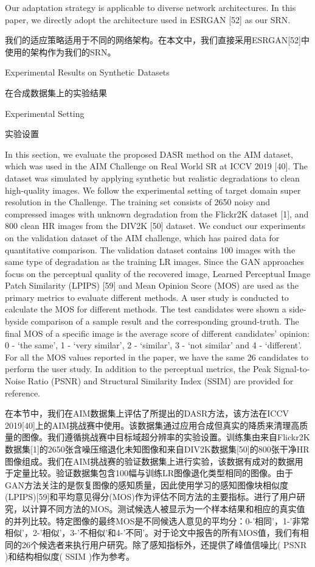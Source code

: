 Our adaptation strategy is applicable to diverse network architectures. In this paper, we directly adopt the architecture used in ESRGAN [52] as our SRN.

我们的适应策略适用于不同的网络架构。在本文中，我们直接采用ESRGAN[52]中使用的架构作为我们的SRN。

Experimental Results on Synthetic Datasets

在合成数据集上的实验结果

Experimental Setting

实验设置

In this section, we evaluate the proposed DASR method on the AIM dataset, which was used in the AIM Challenge on Real World SR at ICCV 2019 [40]. The dataset was simulated by applying synthetic but realistic degradations to clean high-quality images. We follow the experimental setting of target domain super resolution in the Challenge. The training set consists of 2650 noisy and compressed images with unknown degradation from the Flickr2K dataset [1], and 800 clean HR images from the DIV2K [50] dataset. We conduct our experiments on the validation dataset of the AIM challenge, which has paired data for quantitative comparison. The validation dataset contains 100 images with the same type of degradation as the training LR images. Since the GAN approaches focus on the perceptual quality of the recovered image, Learned Perceptual Image Patch Similarity (LPIPS) [59] and Mean Opinion Score (MOS) are used as the primary metrics to evaluate different methods. A user study is conducted to calculate the MOS for different methods. The test candidates were shown a side-byside comparison of a sample result and the corresponding ground-truth. The final MOS of a specific image is the average score of different candidates’ opinion: 0 - ‘the same’, 1 - ‘very similar’, 2 - ‘similar’, 3 - ‘not similar’ and 4 - ‘different’. For all the MOS values reported in the paper, we have the same 26 candidates to perform the user study. In addition to the perceptual metrics, the Peak Signal-to-Noise Ratio (PSNR) and Structural Similarity Index (SSIM) are provided for reference.

在本节中，我们在AIM数据集上评估了所提出的DASR方法，该方法在ICCV 2019[40]上的AIM挑战赛中使用。该数据集通过应用合成但真实的降质来清理高质量的图像。我们遵循挑战赛中目标域超分辨率的实验设置。训练集由来自Flickr2K数据集[1]的2650张含噪压缩退化未知图像和来自DIV2K数据集[50]的800张干净HR图像组成。我们在AIM挑战赛的验证数据集上进行实验，该数据有成对的数据用于定量比较。验证数据集包含100幅与训练LR图像退化类型相同的图像。由于GAN方法关注的是恢复图像的感知质量，因此使用学习的感知图像块相似度(LPIPS)[59]和平均意见得分(MOS)作为评估不同方法的主要指标。进行了用户研究，以计算不同方法的MOS。测试候选人被显示为一个样本结果和相应的真实值的并列比较。特定图像的最终MOS是不同候选人意见的平均分：0-'相同'，1-'非常相似'，2-'相似'，3-'不相似'和4-'不同'。对于论文中报告的所有MOS值，我们有相同的26个候选者来执行用户研究。除了感知指标外，还提供了峰值信噪比( PSNR )和结构相似度( SSIM )作为参考。

